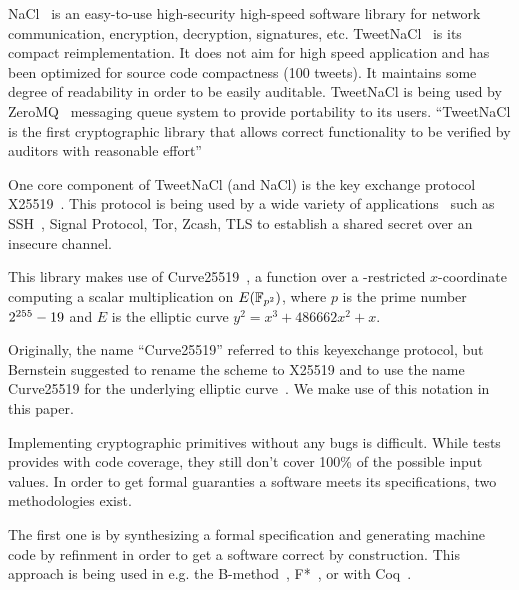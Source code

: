 NaCl~\cite{BLS12} is an easy-to-use high-security high-speed software library
for network communication, encryption, decryption, signatures, etc.
TweetNaCl~\cite{BGJ+15} is its compact reimplementation.
It does not aim for high speed application and has been optimized for source
code compactness (100 tweets). It maintains some degree of readability in order
to be easily auditable.
TweetNaCl is being used by ZeroMQ~\cite{zmq} messaging queue system to provide
portability to its users.
``TweetNaCl is the
first cryptographic library that allows correct functionality to be verified
by auditors with reasonable effort''~\cite{BGJ+15}


One core component of TweetNaCl (and NaCl) is the key exchange protocol X25519~\cite{rfc7748}.
This protocol is being used by a wide variety of applications~\cite{this-that-use-curve25519}
such as SSH~\cite{rfc4253}, Signal Protocol, Tor, Zcash, TLS to establish a shared secret over
an insecure channel.

This library makes use of Curve25519~\cite{Ber06}, a function over a -restricted
$x$-coordinate computing a scalar multiplication on $E(\mathbb{F}_{p^2})$, where $p$ is
the prime number $2^{255}-19$ and $E$ is the elliptic curve $y^2 = x^3 + 486662 x^2 + x$.

Originally, the name ``Curve25519'' referred to this keyexchange protocol,
but Bernstein suggested to rename the scheme to X25519 and to use the name
Curve25519 for the underlying elliptic curve~\cite{Ber14}.
We make use of this notation in this paper.





Implementing cryptographic primitives without any bugs is difficult.
While tests provides with code coverage, they still don't cover 100\% of the
possible input values. In order to get formal guaranties a software meets its
specifications, two methodologies exist.

The first one is by synthesizing a formal specification and generating machine
code by refinment in order to get a software correct by construction.
This approach is being used in e.g. the B-method~\cite{Abrial:1996:BAP:236705},
F*~\cite{DBLP:journals/corr/BhargavanDFHPRR17}, or with Coq~\cite{CpdtJFR}.

